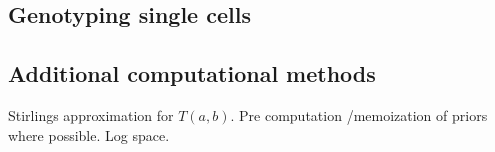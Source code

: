 \documentclass[../main.tex]{subfiles}
\begin{document}

\subsection{Genotyping single cells}


\subsection{Additional computational methods}
Stirlings approximation for $T(a,b)$. Pre computation /memoization of priors where possible. Log space.
\end{document}
